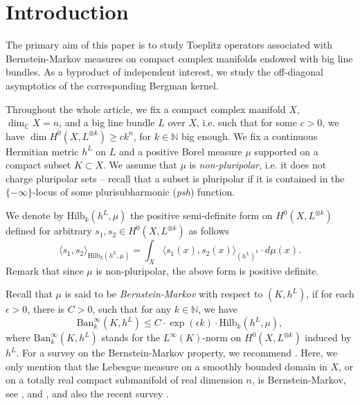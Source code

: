 \documentclass[12pt]{article}
\numberwithin{equation}{section}
\theoremstyle{theorem}
\theoremstyle{definition}
\theoremstyle{remark}
\newcommand{\comp}{\mathbb{C}}
\newcommand{\nat}{\mathbb{N}}
\begin{document}
\section{Introduction}\label{sect_intro}
	The primary aim of this paper is to study Toeplitz operators associated with Bernstein-Markov measures on compact complex manifolds endowed with big line bundles.  
	As a byproduct of independent interest, we study the off-diagonal asymptotics of the corresponding Bergman kernel.
	\par 
	Throughout the whole article, we fix a compact complex manifold $X$, $\dim_{\comp} X = n$, and a big line bundle $L$ over $X$, i.e. such that for some $c > 0$, we have $\dim H^0(X, L^{\otimes k}) \geq c k^n$, for $k \in \nat$ big enough.  
	We fix a continuous Hermitian metric $h^L$ on $L$ and a positive Borel measure $\mu$ supported on a compact subset $K \subset X$.
	We assume that $\mu$ is \textit{non-pluripolar}, i.e. it does not charge pluripolar sets -- recall that a subset is pluripolar if it is contained in the $\{-\infty\}$-locus of some plurisubharmonic (\textit{psh}) function.
	\par 
	We denote by ${\textrm{Hilb}}_k(h^L, \mu)$ the positive semi-definite form on $H^0(X, L^{\otimes k})$ defined for arbitrary $s_1, s_2 \in H^0(X, L^{\otimes k})$ as follows
	\begin{equation}\label{eq_defn_l2}
			\langle s_1, s_2 \rangle_{{\textrm{Hilb}}_k(h^L, \mu)} = \int_X \langle s_1(x), s_2(x) \rangle_{(h^L)^{k}} \cdot d \mu(x).
	\end{equation}
	Remark that since $\mu$ is non-pluripolar, the above form is positive definite.
	\par
	Recall that $\mu$ is said to be \textit{Bernstein-Markov} with respect to $(K, h^L)$, if for each $\epsilon > 0$, there is $C > 0$, such that for any $k \in \nat$, we have
	\begin{equation}\label{eq_bm_clas}
		{\textrm{Ban}}_k^{\infty}(K, h^L)
		\leq
		C
		\cdot
		\exp(\epsilon k)
		\cdot
		{\textrm{Hilb}}_k(h^L, \mu),
	\end{equation}
	where ${\textrm{Ban}}_k^{\infty}(K, h^L)$ stands for the $L^{\infty}(K)$-norm on $H^0(X, L^{\otimes k})$ induced by $h^L$. 
	For a survey on the Bernstein-Markov property, we recommend \cite{BernsteinMarkovSurvey}.  
	Here, we only mention that the Lebesgue measure on a smoothly bounded domain in $X$, or on a totally real compact submanifold of real dimension $n$, is Bernstein-Markov, see \cite[Corollary 1.8]{BerBoucNys}, \cite[Proposition 3.6]{BernsteinMarkovSurvey} and \cite[Theorem 1.3]{MarinescuVu}, and also the recent survey \cite{MarinescuVuSurvey}.
\end{document}
